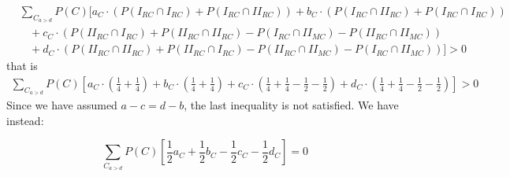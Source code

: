 \documentclass[fleqn,reqno,12pt]{article}
\theoremstyle{Satz}
\theoremstyle{Bsp}
\begin{document}
\begin{align*} 
& \textstyle{\sum_{C_{a>d}}} P(C)[a_{C} \cdot (P(I_{RC}\cap I_{RC}) + P(I_{RC}\cap II_{RC})) + b_{C} \cdot  (P(I_{RC}\cap II_{RC}) + P(I_{RC}\cap I_{RC}))\\
& \ \ \ \ + c_{C} \cdot (P(II_{RC}\cap I_{RC}) +P(II_{RC}\cap II_{RC})- P(I_{RC}\cap II_{MC})- P(II_{RC}\cap II_{MC}))\\
& \ \ \ \ + d_{C} \cdot (P(II_{RC}\cap II_{RC})+P(II_{RC}\cap I_{RC})- P(II_{RC}\cap II_{MC})- P(I_{RC}\cap II_{MC}))]> 0
\end{align*}
that is
\begin{align*}
\textstyle{\sum_{C_{a>d}}} P(C)[a_{C} \cdot (\frac{1}{4}+\frac{1}{4}) + b_{C} \cdot  (\frac{1}{4}+\frac{1}{4}) + c_{C} \cdot (\frac{1}{4}+\frac{1}{4}-\frac{1}{2}-\frac{1}{2}) + d_{C} \cdot (\frac{1}{4}+\frac{1}{4}-\frac{1}{2}-\frac{1}{2})]> 0
\end{align*}
\noindent Since we have assumed $ a-c = d-b $, the last inequality is not satisfied. We have instead:

$$ \sum_{C_{a>d}} P(C)[\frac{1}{2}a_{C}+ \frac{1}{2}b_{C} - \frac{1}{2}c_{C} - \frac{1}{2}d_{C}]= 0 $$
\end{document}
